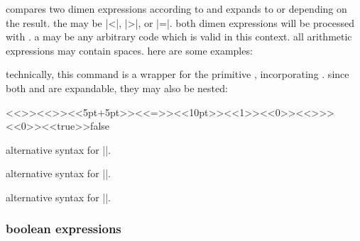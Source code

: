 \begin{ltxsyntax}

compares two dimen expressions according to  and expands to  or  depending on the result. the  may be |<|, |>|, or |=|. both dimen expressions will be processed with . a  may be any arbitrary code which is valid in this context. all arithmetic expressions may contain spaces. here are some examples:

\begin{ltxcode}
\newlength{\lengtha}
\setlength{\lengtha}{<<7.25pt>>}
\newlength{\lengthb}
\setlength{\lengthb}{<<4.75pt>>}
\end{ltxcode}
%
technically, this command is a \latex wrapper for the \tex primitive , incorporating . since both  and  are expandable, they may also be nested:

\begin{ltxcode}
<<\ifnumcomp>>{<<\ifdimcomp>>{<<5pt+5pt>>}{<<=>>}{<<10pt>>}{<<1>>}{<<0>>}}{<<>>>}{<<0>>}{<<true>>}{false}
\end{ltxcode}


alternative syntax for ||.


alternative syntax for ||.


alternative syntax for ||.

\end{ltxsyntax}

\subsubsection{boolean expressions}
\label{aut:tst:bol}

